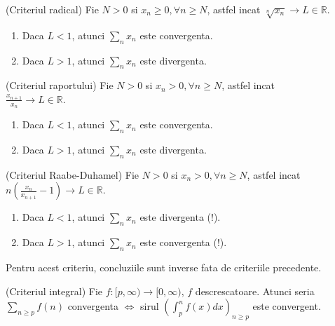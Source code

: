 \documentclass{article}
\begin{document}
\begin{enumerate}
\begin{tcolorbox}
\begin{enumerate}
  \end{enumerate}
\end{tcolorbox}

\begin{tcolorbox}
\propozitie (Criteriul radical) Fie $N > 0$ si $x_n \geq 0, \forall n \geq N$, astfel incat $\sqrt[n]{x_n} \to L \in \mathbb{R}$.

\begin{enumerate}
  \item Daca $L < 1$, atunci $\sum_{n} x_n$ este convergenta.
  \item Daca $L > 1$, atunci $\sum_{n} x_n$ este divergenta.
\end{enumerate}
\end{tcolorbox}

\begin{tcolorbox}
\propozitie (Criteriul raportului) Fie $N > 0$ si $x_n > 0, \forall n \geq N$, astfel incat \\ $\frac{x_{n+1}}{x_n} \to L \in \mathbb{R}$.

\begin{enumerate}
  \item Daca $L < 1$, atunci $\sum_{n} x_n$ este convergenta.
  \item Daca $L > 1$, atunci $\sum_{n} x_n$ este divergenta.
\end{enumerate}
\end{tcolorbox}

\begin{tcolorbox}
\propozitie (Criteriul Raabe-Duhamel) Fie $N > 0$ si $x_n > 0, \forall n \geq N$, astfel incat \\ $n \left(\frac{x_n}{x_{n+1}} - 1 \right) \to L \in \mathbb{R}$.

  \begin{enumerate}
    \item Daca $L < 1$, atunci $\sum_{n} x_n$ este divergenta (!).
    \item Daca $L > 1$, atunci $\sum_{n} x_n$ este convergenta (!).
  \end{enumerate}
\observatie Pentru acest criteriu, concluziile sunt inverse fata de criteriile precedente.
\end{tcolorbox}

\begin{tcolorbox}
\propozitie (Criteriul integral) Fie $f : [p, \infty) \to [0, \infty)$, $f$ descrescatoare. Atunci seria $\sum_{n \geq p} f(n)$ convergenta $\Leftrightarrow$ sirul $\left(\int_p^n f(x) dx \right)_{n \geq p}$ este convergent.
\end{tcolorbox}

\end{enumerate}
\end{document}
